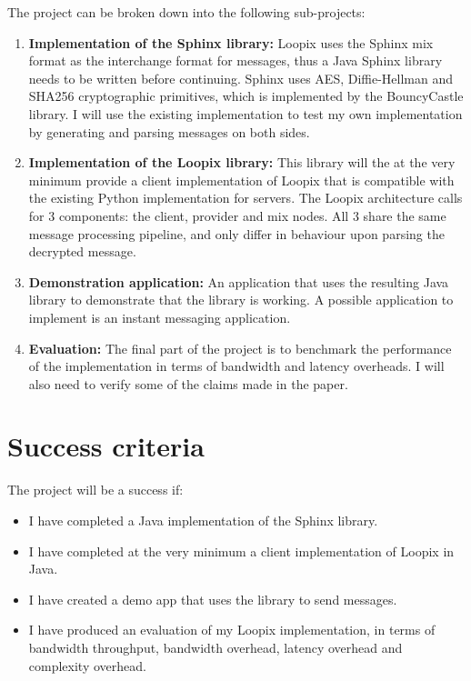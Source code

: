 \documentclass[12pt,a4paper,twoside]{article}
\begin{document}
	The project can be broken down into the following sub-projects:
	
	\begin{enumerate}
		\item \textbf{Implementation of the Sphinx library:} Loopix uses the Sphinx mix format as the interchange format for messages, thus a Java Sphinx library needs to be written before continuing. Sphinx uses AES, Diffie-Hellman and SHA256 cryptographic primitives, which is implemented by the BouncyCastle library. I will use the existing implementation to test my own implementation by generating and parsing messages on both sides.
		\item \textbf{Implementation of the Loopix library:} This library will the at the very minimum provide a client implementation of Loopix that is compatible with the existing Python implementation for servers. The Loopix architecture calls for 3 components: the client, provider and mix nodes. All 3 share the same message processing pipeline, and only differ in behaviour upon parsing the decrypted message.
		\item \textbf{Demonstration application:} An application that uses the resulting Java library to demonstrate that the library is working. A possible application to implement is an instant messaging application.
		\item \textbf{Evaluation:} The final part of the project is to benchmark the performance of the implementation in terms of bandwidth and latency overheads. I will also need to verify some of the claims made in the paper.
	\end{enumerate}
	
	\section*{Success criteria}
	
	The project will be a success if:
	
	\begin{itemize}
		\item I have completed a Java implementation of the Sphinx library.
		\item I have completed at the very minimum a client implementation of Loopix in Java.
		\item I have created a demo app that uses the library to send messages.
		\item I have produced an evaluation of my Loopix implementation, in terms of bandwidth throughput, bandwidth overhead, latency overhead and complexity overhead.
	\end{itemize}
	
\end{document}
